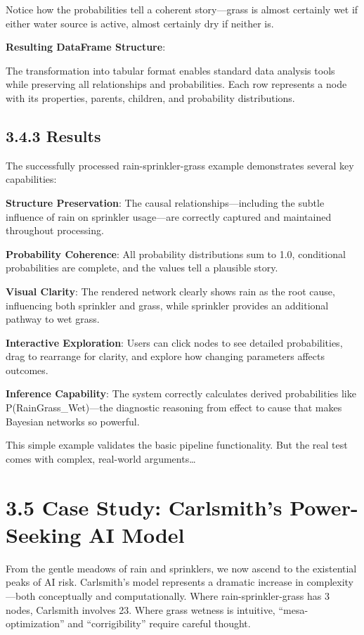 \documentclass[
  11pt,
  letterpaper,
]{book}
\begin{document}
Notice how the probabilities tell a coherent story---grass is almost
certainly wet if either water source is active, almost certainly dry if
neither is.

\textbf{Resulting DataFrame Structure}:

The transformation into tabular format enables standard data analysis
tools while preserving all relationships and probabilities. Each row
represents a node with its properties, parents, children, and
probability distributions.

\subsection{3.4.3 Results}\label{sec-rsg-results}

The successfully processed rain-sprinkler-grass example demonstrates
several key capabilities:

\textbf{Structure Preservation}: The causal relationships---including
the subtle influence of rain on sprinkler usage---are correctly captured
and maintained throughout processing.

\textbf{Probability Coherence}: All probability distributions sum to
1.0, conditional probabilities are complete, and the values tell a
plausible story.

\textbf{Visual Clarity}: The rendered network clearly shows rain as the
root cause, influencing both sprinkler and grass, while sprinkler
provides an additional pathway to wet grass.

\textbf{Interactive Exploration}: Users can click nodes to see detailed
probabilities, drag to rearrange for clarity, and explore how changing
parameters affects outcomes.

\textbf{Inference Capability}: The system correctly calculates derived
probabilities like P(Rain\textbar Grass\_Wet)---the diagnostic reasoning
from effect to cause that makes Bayesian networks so powerful.

This simple example validates the basic pipeline functionality. But the
real test comes with complex, real-world arguments\ldots{}

\section{3.5 Case Study: Carlsmith's Power-Seeking AI
Model}\label{sec-case-carlsmith}

From the gentle meadows of rain and sprinklers, we now ascend to the
existential peaks of AI risk. Carlsmith's model represents a dramatic
increase in complexity---both conceptually and computationally. Where
rain-sprinkler-grass has 3 nodes, Carlsmith involves 23. Where grass
wetness is intuitive, ``mesa-optimization'' and ``corrigibility''
require careful thought.
\end{document}
